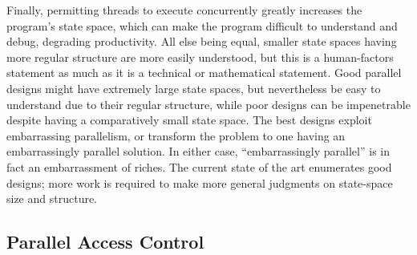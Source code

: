 \QuickQuizEnd

Finally, permitting threads to execute concurrently greatly increases
the program's state space, which can make the program difficult to
understand and debug, degrading productivity.
All else being equal, smaller state spaces having more regular structure
are more easily understood, but this is a human-factors statement as much
as it is a technical or mathematical statement.
Good parallel designs might have extremely large state spaces, but
nevertheless be easy to understand due to their regular structure,
while poor designs can be impenetrable despite having a comparatively
small state space.
The best designs exploit embarrassing parallelism, or transform the
problem to one having an embarrassingly parallel solution.
In either case, ``embarrassingly parallel'' is in fact
an embarrassment of riches.
The current state of the art enumerates good designs; more work is
required to make more general judgments on
state-space size and structure.

\subsection{Parallel Access Control}
\label{sec:Parallel Access Control}

